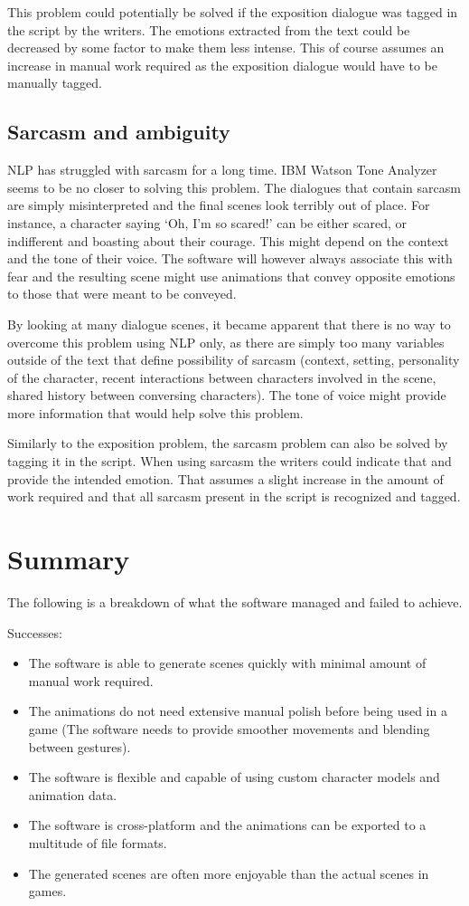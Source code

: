 This problem could potentially be solved if the exposition dialogue was tagged in the script by the writers. The emotions extracted from the text could be decreased by some factor to make them less intense. This of course assumes an increase in manual work required as the exposition dialogue would have to be manually tagged.


\subsection{Sarcasm and ambiguity}
NLP has struggled with sarcasm for a long time. IBM Watson Tone Analyzer seems to be no closer to solving this problem. The dialogues that contain sarcasm are simply misinterpreted and the final scenes look terribly out of place. For instance, a character saying `Oh, I'm so scared!' can be either scared, or indifferent and boasting about their courage. This might depend on the context and the tone of their voice. The software will however always associate this with fear and the resulting scene might use animations that convey opposite emotions to those that were meant to be conveyed.

By looking at many dialogue scenes, it became apparent that there is no way to overcome this problem using NLP only, as there are simply too many variables outside of the text that define possibility of sarcasm (context, setting, personality of the character, recent interactions between characters involved in the scene, shared history between conversing characters). The tone of voice might provide more information that would help solve this problem.

Similarly to the exposition problem, the sarcasm problem can also be solved by tagging it in the script. When using sarcasm the writers could indicate that and provide the intended emotion. That assumes a slight increase in the amount of work required and that all sarcasm present in the script is recognized and tagged.


\section{Summary}
The following is a breakdown of what the software managed and failed to achieve.

\noindent Successes:
\begin{itemize}
	\item The software is able to generate scenes quickly with minimal amount of manual work required.
	\item The animations do not need extensive manual polish before being used in a game (The software needs to provide smoother movements and blending between gestures).
	\item The software is flexible and capable of using custom character models and animation data.
	\item The software is cross-platform and the animations can be exported to a multitude of file formats.
	\item The generated scenes are often more enjoyable than the actual scenes in games.
\end{itemize}

